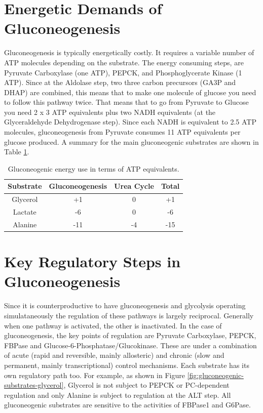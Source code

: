 \documentclass{tufte-handout}
\begin{document}
\section{Energetic Demands of Gluconeogenesis}

Gluconeogenesis is typically energetically costly.  It requires a variable number of ATP molecules depending on the substrate.  The energy consuming steps, are Pyruvate Carboxylase (one ATP), PEPCK, and Phosphoglycerate Kinase (1 ATP).  Since at the Aldolase step, two three carbon precursors (GA3P and DHAP) are combined, this means that to make one molecule of glucose you need to follow this pathway twice.  That means that to go from Pyruvate to Glucose you need 2 x 3 ATP equivalents plus two NADH equivalents (at the Glyceraldehyde Dehydrogenase step).  Since each NADH is equivalent to 2.5 ATP molecules, gluconeogenesis from Pyruvate consumes 11 ATP equivalents per glucose produced.  A summary for the main gluconeogenic substrates are shown in Table \ref{tab:gluconeogenesis-energetics}.

\begin{table}
\centering
\caption{Gluconeogenic energy use in terms of ATP equivalents.}
\label{tab:gluconeogenesis-energetics}
\begin{tabular}{cccc}
\hline
\textbf {Substrate} & \textbf{Gluconeogenesis}  & \textbf{Urea Cycle} & \textbf{Total}\\
\hline
Glycerol & +1 & 0 & +1\\
Lactate & -6 & 0 & -6 \\
Alanine & -11 & -4 & -15\\
\hline
\end{tabular}
\end{table}

\section{Key Regulatory Steps in Gluconeogenesis}

Since it is counterproductive to have gluconeogenesis and glycolysis operating simulataneously the regulation of these pathways is largely reciprocal.  Generally when one pathway is activated, the other is inactivated.  In the case of gluconeogenesis, the key points of regulation are Pyruvate Carboxylase, PEPCK, FBPase and Glucose-6-Phosphatase/Glucokinase.  These are under a combination of acute (rapid and reversible, mainly allosteric) and chronic (slow and permanent, mainly transcriptional) control mechanisms. Each substrate has its own regulatory path too.  For example, as shown in Figure \ref{fig:gluconeogenic-substrates-glycerol}, Glycerol is not subject to PEPCK or PC-dependent regulation and only Alanine is subject to regulation at the ALT step.  All gluconeogenic substrates are sensitive to the activities of FBPase1 and G6Pase.  
\end{document}
